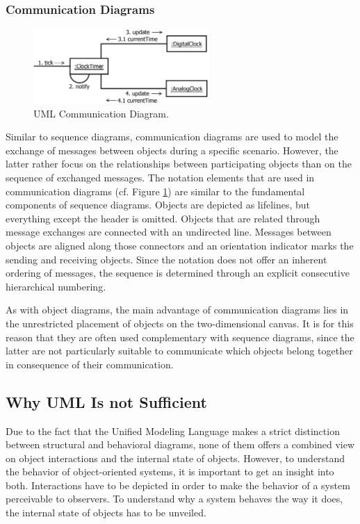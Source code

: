 \subsubsection{Communication Diagrams}

\begin{figure}
	\centering
	\includegraphics[width=0.6\textwidth]{../images/02-Communication}
	\caption{UML Communication Diagram.}
	\label{fig:BackgroundModelingCommunication}
\end{figure}

Similar to sequence diagrams, communication diagrams \cite{rumbaugh_unified_2010} are used to model the exchange of messages between objects during a specific scenario.
However, the latter rather focus on the relationships between participating objects than on the sequence of exchanged messages.
The notation elements that are used in communication diagrams (cf. Figure \ref{fig:BackgroundModelingCommunication}) are similar to the fundamental components of sequence diagrams.
Objects are depicted as lifelines, but everything except the header is omitted.
Objects that are related through message exchanges are connected with an undirected line.
Messages between objects are aligned along those connectors and an orientation indicator marks the sending and receiving objects.
Since the notation does not offer an inherent ordering of messages, the sequence is determined through an explicit consecutive hierarchical numbering.

As with object diagrams, the main advantage of communication diagrams lies in the unrestricted placement of objects on the two-dimensional canvas.
It is for this reason that they are often used complementary with sequence diagrams, since the latter are not particularly suitable to communicate which objects belong together in consequence of their communication.

\subsection{Why UML Is not Sufficient}
\label{ss:BackgroundModelingChallenges}
Due to the fact that the Unified Modeling Language makes a strict distinction between structural and behavioral diagrams, none of them offers a combined view on object interactions and the internal state of objects.
However, to understand the behavior of object-oriented systems, it is important to get an insight into both.
Interactions have to be depicted in order to make the behavior of a system perceivable to observers.
To understand why a system behaves the way it does, the internal state of objects has to be unveiled.

